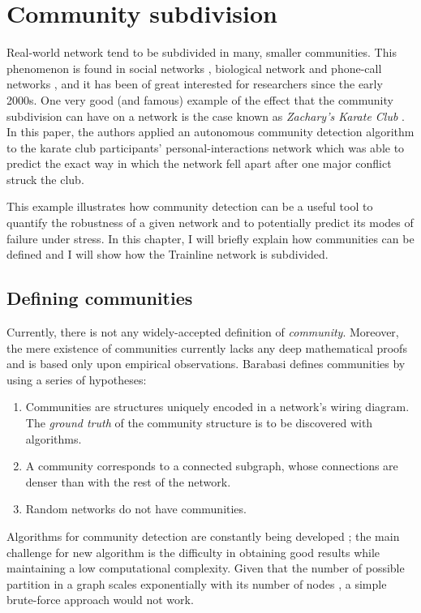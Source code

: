 \section{Community subdivision}
Real-world network tend to be subdivided in many, smaller communities. This phenomenon is found in social networks \cite{barabasi283}, biological network \cite{barabasi288} and phone-call networks \cite{barabasi282}, and it has been of great interested for researchers since the early 2000s. One very good (and famous) example of the effect that the community subdivision can have on a network is the case known as \emph{Zachary's Karate Club} \cite{karateclub}. In this paper, the authors applied an autonomous community detection algorithm to the karate club participants' personal-interactions network which was able to predict the exact way in which the network fell apart after one major conflict struck the club.

This example illustrates how community detection can be a useful tool to quantify the robustness of a given network and to potentially predict its modes of failure under stress. In this chapter, I will briefly explain how communities can be defined and I will show how the Trainline network is subdivided.

\subsection{Defining communities}
Currently, there is not any widely-accepted definition of \emph{community}. Moreover, the mere existence of communities currently lacks any deep mathematical proofs and is based only upon empirical observations.  Barabasi \cite{barabasi} defines communities by using a series of hypotheses:
\begin{enumerate}
    \item Communities are structures uniquely encoded in a network's wiring diagram. The \emph{ground truth} of the community structure is to be discovered with algorithms.
    \item A community corresponds to a connected subgraph, whose connections are denser than with the rest of the network.
    \item Random networks do not have communities.
\end{enumerate}

Algorithms for community detection are constantly being developed \cite{communityDetection}; the main challenge for new algorithm is the difficulty in obtaining good results while maintaining a low computational complexity.
Given that the number of possible partition in a graph scales exponentially with its number of nodes \cite{barabasi}, a  simple brute-force approach would not work.

